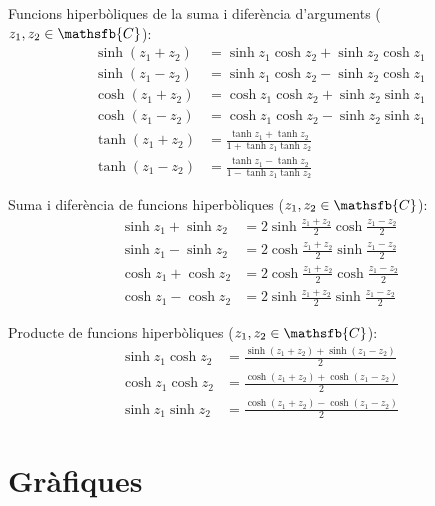 Funcions hiperbòliques de la suma i diferència d'arguments ($z_1,
z_2\in\mathsfb{C}$):
\begin{subequations}
\begin{align}
    \sinh(z_1+z_2) &= \sinh z_1 \cosh z_2 + \sinh z_2\cosh z_1\\[1ex]
    \sinh(z_1-z_2) &= \sinh z_1 \cosh z_2 - \sinh z_2\cosh z_1\\[1ex]
    \cosh(z_1+z_2) &= \cosh z_1 \cosh z_2 + \sinh z_2\sinh z_1\\[1ex]
    \cosh(z_1-z_2) &= \cosh z_1 \cosh z_2 - \sinh z_2\sinh z_1\\[1ex]
    \tanh(z_1+z_2) &=\frac{\tanh z_1+\tanh z_2}{1+\tanh z_1\tanh z_2}\\[1ex]
    \tanh(z_1-z_2) &=\frac{\tanh z_1-\tanh z_2}{1-\tanh z_1\tanh z_2}
\end{align}
\end{subequations}

Suma i diferència de funcions hiperbòliques ($z_1,
z_2\in\mathsfb{C}$):
\begin{subequations}
\begin{align}
    \sinh z_1+\sinh z_2 &= 2 \sinh\frac{z_1+z_2}{2}
    \cosh\frac{z_1-z_2}{2}\\[1ex]
    \sinh z_1-\sinh z_2 &= 2 \cosh\frac{z_1+z_2}{2}
    \sinh\frac{z_1-z_2}{2}\\[1ex]
    \cosh z_1+\cosh z_2 &= 2 \cosh\frac{z_1+z_2}{2}
    \cosh\frac{z_1-z_2}{2}\\[1ex]
    \cosh z_1-\cosh z_2 &= 2 \sinh\frac{z_1+z_2}{2}
    \sinh\frac{z_1-z_2}{2}
\end{align}
\end{subequations}

Producte de funcions hiperbòliques ($z_1, z_2\in\mathsfb{C}$):
\begin{subequations}
\begin{align}
    \sinh z_1 \cosh z_2 &=
    \frac{\sinh(z_1+z_2)+\sinh(z_1-z_2)}{2}\\[1ex]
    \cosh z_1 \cosh z_2 &=
    \frac{\cosh(z_1+z_2)+\cosh(z_1-z_2)}{2}\\[1ex]
    \sinh z_1 \sinh z_2 &=
    \frac{\cosh(z_1+z_2)-\cosh(z_1-z_2)}{2}
\end{align}
\end{subequations}


\section{Gràfiques}\label{sec:trig-grafics}

